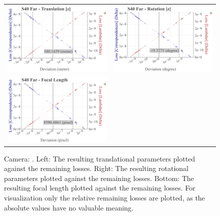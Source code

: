 \begin{figure}[!ht]
\begin{tabular}{cc}
    \includegraphics[width=0.45 \linewidth]{diagrams/calibration/s40_n_far/parameters.csv/Translation[z]_vs_Loss[Correspondences]_vs_Loss[Lambdas]_cluster_All.png} &
    \includegraphics[width=0.45 \linewidth]{diagrams/calibration/s40_n_far/parameters.csv/Rotation[z]_vs_Loss[Correspondences]_vs_Loss[Lambdas]_cluster_All.png} \\

    \includegraphics[width=0.45 \linewidth]{diagrams/calibration/s40_n_far/parameters.csv/FocalLength_vs_Loss[Correspondences]_vs_Loss[Lambdas]_cluster_All.png} &
\end{tabular}
\caption{
  Camera: .
  Left: The resulting translational parameters plotted against the remaining losses. 
  Right: The resulting rotational parameters plotted against the remaining losses.
  Bottom: The resulting focal length  plotted against the remaining losses.
  For visualization only the relative remaining losses are plotted, as the absolute values have no valuable meaning.
   }
\label{fig:static_calibration_algorithmic_error_s40_n_far}
\end{figure}

